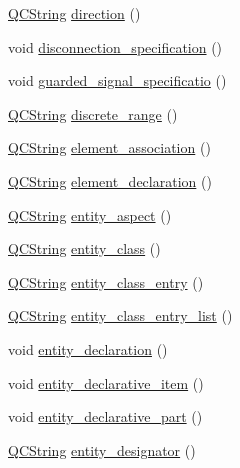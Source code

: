 \begin{DoxyCompactItemize}
\item 
\hyperlink{class_q_c_string}{Q\+C\+String} \hyperlink{classvhdl_1_1parser_1_1_vhdl_parser_aa1ca2c7b08e6a8179dc840f0cd6844d7}{direction} ()
\item 
void \hyperlink{classvhdl_1_1parser_1_1_vhdl_parser_a26b43b02b6f3ce0c2f7ec0f936d22294}{disconnection\+\_\+specification} ()
\item 
void \hyperlink{classvhdl_1_1parser_1_1_vhdl_parser_ae059bbe83ad53b3fa4afa30ff14f99d2}{guarded\+\_\+signal\+\_\+specificatio} ()
\item 
\hyperlink{class_q_c_string}{Q\+C\+String} \hyperlink{classvhdl_1_1parser_1_1_vhdl_parser_a99c0f77bb7feeea5179fdaf83d7b1585}{discrete\+\_\+range} ()
\item 
\hyperlink{class_q_c_string}{Q\+C\+String} \hyperlink{classvhdl_1_1parser_1_1_vhdl_parser_a9c5f305334681d97dec259d7d43ce38a}{element\+\_\+association} ()
\item 
\hyperlink{class_q_c_string}{Q\+C\+String} \hyperlink{classvhdl_1_1parser_1_1_vhdl_parser_ab66a5efe0ee637b4c76b56f79208a999}{element\+\_\+declaration} ()
\item 
\hyperlink{class_q_c_string}{Q\+C\+String} \hyperlink{classvhdl_1_1parser_1_1_vhdl_parser_aa5d452a276a92be3279e0a3f4804ca14}{entity\+\_\+aspect} ()
\item 
\hyperlink{class_q_c_string}{Q\+C\+String} \hyperlink{classvhdl_1_1parser_1_1_vhdl_parser_a7b77a13108c368688e9a253b4b722b07}{entity\+\_\+class} ()
\item 
\hyperlink{class_q_c_string}{Q\+C\+String} \hyperlink{classvhdl_1_1parser_1_1_vhdl_parser_a93fb12efc8710f234078ebfbf0cb6054}{entity\+\_\+class\+\_\+entry} ()
\item 
\hyperlink{class_q_c_string}{Q\+C\+String} \hyperlink{classvhdl_1_1parser_1_1_vhdl_parser_a79dace713dc67f4e931a9b8d8361f71b}{entity\+\_\+class\+\_\+entry\+\_\+list} ()
\item 
void \hyperlink{classvhdl_1_1parser_1_1_vhdl_parser_a7e4b0ddc6c35194ea6a125e8348dbc37}{entity\+\_\+declaration} ()
\item 
void \hyperlink{classvhdl_1_1parser_1_1_vhdl_parser_a3190e36a016fd775824afbbab0c5230a}{entity\+\_\+declarative\+\_\+item} ()
\item 
void \hyperlink{classvhdl_1_1parser_1_1_vhdl_parser_aee9442fb02c7de96a8c82ba79417dc3a}{entity\+\_\+declarative\+\_\+part} ()
\item 
\hyperlink{class_q_c_string}{Q\+C\+String} \hyperlink{classvhdl_1_1parser_1_1_vhdl_parser_a7b27b4952059281beda9cbdc34d53b01}{entity\+\_\+designator} ()

\end{DoxyCompactItemize}

